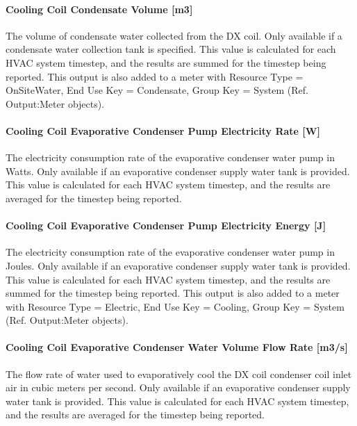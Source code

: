 \paragraph{Cooling Coil Condensate Volume {[}m3{]}}

The volume of condensate water collected from the DX coil. Only available if a condensate water collection tank is specified. This value is calculated for each HVAC system timestep, and the results are summed for the timestep being reported. This output is also added to a meter with Resource Type = OnSiteWater, End Use Key = Condensate, Group Key = System (Ref. Output:Meter objects).

\paragraph{Cooling Coil Evaporative Condenser Pump Electricity Rate {[}W{]}}

The electricity consumption rate of the evaporative condenser water pump in Watts. Only available if an evaporative condenser supply water tank is provided. This value is calculated for each HVAC system timestep, and the results are averaged for the timestep being reported.

\paragraph{Cooling Coil Evaporative Condenser Pump Electricity Energy {[}J{]}}

The electricity consumption rate of the evaporative condenser water pump in Joules. Only available if an evaporative condenser supply water tank is provided. This value is calculated for each HVAC system timestep, and the results are summed for the timestep being reported. This output is also added to a meter with Resource Type = Electric, End Use Key = Cooling, Group Key = System (Ref. Output:Meter objects).

\paragraph{Cooling Coil Evaporative Condenser Water Volume Flow Rate {[}m3/s{]}}

The flow rate of water used to evaporatively cool the DX coil condenser coil inlet air in cubic meters per second. Only available if an evaporative condenser supply water tank is provided. This value is calculated for each HVAC system timestep, and the results are averaged for the timestep being reported.

